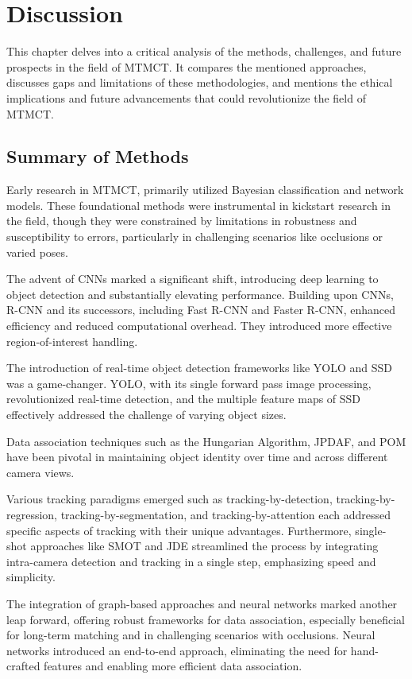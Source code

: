 \chapter{Discussion}\label{chap:discussion}
This chapter delves into a critical analysis of the methods, challenges, and future prospects in the field of MTMCT. It compares the mentioned approaches, discusses gaps and limitations of these methodologies, and mentions the ethical implications and future advancements that could revolutionize the field of MTMCT.

\section{Summary of Methods}\label{sec:summary_of_methods}
Early research in MTMCT, primarily utilized Bayesian classification and network models. These foundational methods were instrumental in kickstart research in the field, though they were constrained by limitations in robustness and susceptibility to errors, particularly in challenging scenarios like occlusions or varied poses.

The advent of CNNs marked a significant shift, introducing deep learning to object detection and substantially elevating performance. Building upon CNNs, R-CNN and its successors, including Fast R-CNN and Faster R-CNN, enhanced efficiency and reduced computational overhead. They introduced more effective region-of-interest handling.

The introduction of real-time object detection frameworks like YOLO and SSD was a game-changer. YOLO, with its single forward pass image processing, revolutionized real-time detection, and the multiple feature maps of SSD effectively addressed the challenge of varying object sizes.

Data association techniques such as the Hungarian Algorithm, JPDAF, and POM have been pivotal in maintaining object identity over time and across different camera views.

Various tracking paradigms emerged such as tracking-by-detection, tracking-by-regression, tracking-by-segmentation, and tracking-by-attention each addressed specific aspects of tracking with their unique advantages. Furthermore, single-shot approaches like SMOT and JDE streamlined the process by integrating intra-camera detection and tracking in a single step, emphasizing speed and simplicity.

The integration of graph-based approaches and neural networks marked another leap forward, offering robust frameworks for data association, especially beneficial for long-term matching and in challenging scenarios with occlusions. Neural networks introduced an end-to-end approach, eliminating the need for hand-crafted features and enabling more efficient data association.


